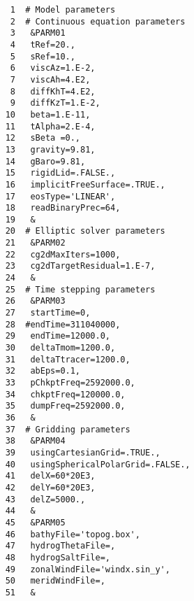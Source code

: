 
\begin{verbatim}
     1	# Model parameters
     2	# Continuous equation parameters
     3	 &PARM01
     4	 tRef=20.,
     5	 sRef=10.,
     6	 viscAz=1.E-2,
     7	 viscAh=4.E2,
     8	 diffKhT=4.E2,
     9	 diffKzT=1.E-2,
    10	 beta=1.E-11,
    11	 tAlpha=2.E-4,
    12	 sBeta =0.,
    13	 gravity=9.81,
    14	 gBaro=9.81,
    15	 rigidLid=.FALSE.,
    16	 implicitFreeSurface=.TRUE.,
    17	 eosType='LINEAR',
    18	 readBinaryPrec=64,
    19	 &
    20	# Elliptic solver parameters
    21	 &PARM02
    22	 cg2dMaxIters=1000,
    23	 cg2dTargetResidual=1.E-7,
    24	 &
    25	# Time stepping parameters
    26	 &PARM03
    27	 startTime=0,
    28	#endTime=311040000,
    29	 endTime=12000.0,
    30	 deltaTmom=1200.0,
    31	 deltaTtracer=1200.0,
    32	 abEps=0.1,
    33	 pChkptFreq=2592000.0,
    34	 chkptFreq=120000.0,
    35	 dumpFreq=2592000.0,
    36	 &
    37	# Gridding parameters
    38	 &PARM04
    39	 usingCartesianGrid=.TRUE.,
    40	 usingSphericalPolarGrid=.FALSE.,
    41	 delX=60*20E3,
    42	 delY=60*20E3,
    43	 delZ=5000.,
    44	 &
    45	 &PARM05
    46	 bathyFile='topog.box',
    47	 hydrogThetaFile=,
    48	 hydrogSaltFile=,
    49	 zonalWindFile='windx.sin_y',
    50	 meridWindFile=,
    51	 &
\end{verbatim}
